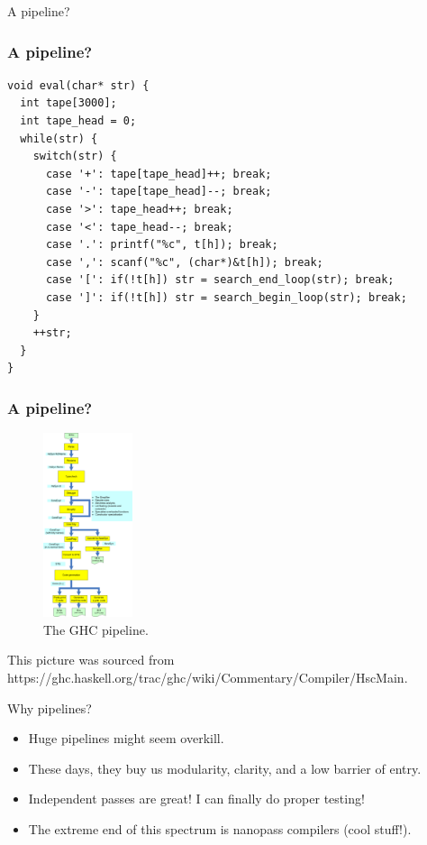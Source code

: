 \documentclass[aspectratio=169]{beamer}
\begin{document}
  \begin{frame}{A pipeline?}
  \end{frame}
  \begin{frame}[fragile]
    \frametitle{A pipeline?}
    \begin{listing}[H]
      \caption{A silly Brainfuck VM}
      \begin{verbatim}
void eval(char* str) {
  int tape[3000];
  int tape_head = 0;
  while(str) {
    switch(str) {
      case '+': tape[tape_head]++; break;
      case '-': tape[tape_head]--; break;
      case '>': tape_head++; break;
      case '<': tape_head--; break;
      case '.': printf("%c", t[h]); break;
      case ',': scanf("%c", (char*)&t[h]); break;
      case '[': if(!t[h]) str = search_end_loop(str); break;
      case ']': if(!t[h]) str = search_begin_loop(str); break;
    }
    ++str;
  }
}
      \end{verbatim}
    \end{listing}
  \end{frame}
  \begin{frame}[fragile]
    \frametitle{A pipeline?}
    \begin{figure}
      \includegraphics[height=5.4cm]{ghc_pipeline.png}
      \caption{The GHC pipeline.}
    \end{figure}
    \scriptsize This picture was sourced from https://ghc.haskell.org/trac/ghc/wiki/Commentary/Compiler/HscMain.
  \end{frame}
  \begin{frame}{Why pipelines?}
    \begin{itemize}
      \item Huge pipelines might seem overkill.
      \item These days, they buy us modularity, clarity, and a low barrier of entry.
      \item Independent passes are great! I can finally do proper testing!
      \item The extreme end of this spectrum is nanopass compilers (cool stuff!).
    \end{itemize}
  \end{frame}
\end{document}
